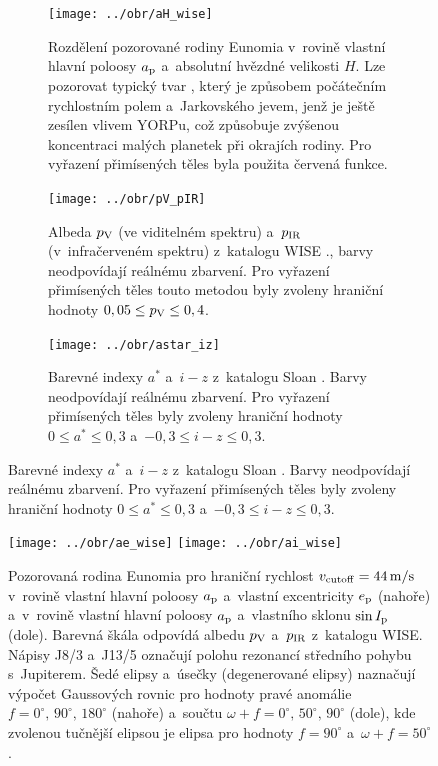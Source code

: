 \documentclass{beamer}
\newlength{\vyska}
\newlength{\vyskaB}
\newlength{\main}
\begin{document}
\begin{frame}
\begin{columns}[t]
\begin{column}{\main}
\begin{tcolorbox}[title=Výsledky\phantom{Úy},height=\vyskaB]
		\begin{figure}
			\centering
			\begin{subfigure}[t]{0.3\textwidth}
				\centering
				\texttt{[image: ../obr/aH\_wise]}
				\caption{Rozdělení pozorované rodiny Eunomia v~rovině vlastní hlavní poloosy $a_{\rm p}$ a~absolutní hvězdné velikosti $H$. Lze pozorovat typický tvar , který je způsobem počátečním rychlostním polem a~Jarkovského jevem, jenž je ještě zesílen vlivem YORPu, což způsobuje zvýšenou koncentraci malých planetek při okrajích rodiny. Pro vyřazení přimísených těles byla použita červená funkce.}
				\label{fig:aH_wise}
			\end{subfigure}
			\begin{subfigure}[t]{0.3\textwidth}
				\centering
				\texttt{[image: ../obr/pV\_pIR]}
				\caption{Albeda $p_{\rm V}$ (ve viditelném spektru) a~$p_{\rm IR}$ (v~infračerveném spektru) z~katalogu WISE \cite{nugent15}., barvy neodpovídají reálnému zbarvení. Pro vyřazení přimísených těles touto metodou byly zvoleny hraniční hodnoty $0,05 \leq p_{\rm V} \leq 0,4$.}
				\label{fig:pV_pIR}
			\end{subfigure}
			\begin{subfigure}[t]{0.3\textwidth}
				\centering
				\texttt{[image: ../obr/astar\_iz]}
				\caption{Barevné indexy $a^*$ a~$i-z$ z~katalogu Sloan \cite{ivezic01}. Barvy neodpovídají reálnému zbarvení. Pro vyřazení přimísených těles byly zvoleny hraniční hodnoty $0\leq a^* \leq 0,3$ a~$-0,3\leq i-z \leq 0,3$.}
				\label{fig:astar_iz}
			\end{subfigure}
		\end{figure}

		\begin{figure}
			\centering
			\texttt{[image: ../obr/ae\_wise]}
			\texttt{[image: ../obr/ai\_wise]}
			\caption{Pozorovaná rodina Eunomia pro hraniční rychlost $v_{\rm cutoff} = 44\,{\rm m/s}$ v~rovině vlastní hlavní poloosy $a_{\rm p}$ a~vlastní excentricity $e_{\rm p}$ (nahoře) a~v~rovině vlastní hlavní poloosy $a_{\rm p}$ a~vlastního sklonu $\sin I_{\rm p}$ (dole). Barevná škála odpovídá albedu $p_{\rm V}$ a~$p_{\rm IR}$ z~katalogu WISE\@. Nápisy J8/3 a~J13/5 označují polohu rezonancí středního pohybu s~Jupiterem. Šedé elipsy a~úsečky (degenerované elipsy) naznačují výpočet Gaussových rovnic pro hodnoty pravé anomálie $f=0^\circ,\,90^\circ,\,180^\circ$ (nahoře) a~součtu $\omega+f=0^\circ,\, 50^\circ,\, 90^\circ$ (dole), kde zvolenou tučnější elipsou je elipsa pro hodnoty $f=90^\circ$ a~$\omega+f=50^\circ$.}
			\label{fig:ae_ai_wise}
		\end{figure}


\end{tcolorbox}
\end{column}
\end{columns}
\end{frame}
\end{document}

